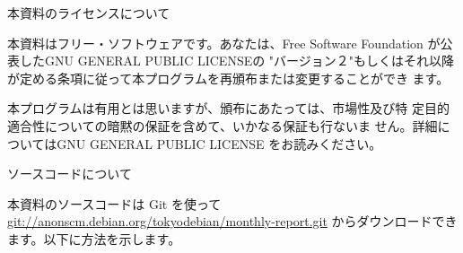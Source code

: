 \documentclass[mingoth,a4paper]{jsarticle}
\begin{document}

\newpage

\begin{center}
本資料のライセンスについて
\end{center}

\begin{fontsize}{6}{6}

本資料はフリー・ソフトウェアです。あなたは、Free Software
Foundation が公表したGNU GENERAL PUBLIC LICENSEの "バージョン２"もしくはそれ以降
が定める条項に従って本プログラムを再頒布または変更することができ
ます。

本プログラムは有用とは思いますが、頒布にあたっては、市場性及び特
定目的適合性についての暗黙の保証を含めて、いかなる保証も行ないま
せん。詳細についてはGNU GENERAL PUBLIC LICENSE をお読みください。

\end{fontsize}

\begin{center}
ソースコードについて
\end{center}

本資料のソースコードは Git を使って\url{git://anonscm.debian.org/tokyodebian/monthly-report.git}
からダウンロードできます。以下に方法を示します。

\end{document}
